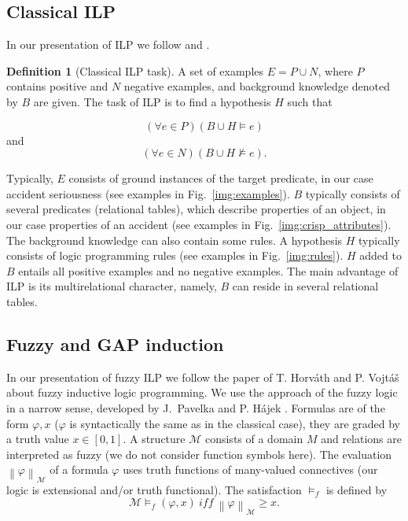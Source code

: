 \subsection{Classical ILP} \label{sec:ch80_ILP_classic}

In our presentation of ILP we follow \cite{dzeroski2001:relat_dm} and  \cite{biblio:Muggleton94inductivelogic}.


\theoremstyle{definition}
\newtheorem{definition}{Definition}
\newtheorem{theorem}{Theorem}

\begin{definition}[Classical ILP task]
A set of examples $E=P\cup N$, where $P$ contains positive and $N$ negative examples, and background knowledge denoted by $B$ are given. The task of ILP is to find a hypothesis $H$ such that 

$$
(\forall e\in P)(B\cup H\models e)
$$
and
$$
(\forall e\in N)(B\cup H\not\models e).
$$
\end{definition}
Typically, $E$ consists of ground instances of the target predicate, in our case accident seriousness (see examples in Fig.~\ref{img:examples}). $B$ typically consists of several predicates (relational tables), which describe properties of an object, in our case properties of an accident (see examples in Fig.~\ref{img:crisp_attributes}). The background knowledge can also contain some rules. A hypothesis $H$ typically consists of logic programming rules (see examples in Fig.~\ref{img:rules}). $H$ added to $B$ entails all positive examples and no negative examples.
%
The main advantage of ILP is its multirelational character, namely, $B$ can reside in several relational tables.





\subsection{Fuzzy and GAP induction}

In our presentation of fuzzy ILP we follow the paper of T. Horv\'ath and P. Vojt\'a\v s \citep{biblio:FILP} about fuzzy inductive logic programming.
We use the approach of the fuzzy logic in a narrow sense, developed by J.~Pavelka \citep{biblio:Pavelka} and P. H\'ajek \citep{biblio:Hajek}. Formulas are of the form $\varphi, x$ ($\varphi$ is syntactically the same as in the classical case), they are graded by a truth value $x\in [0,1]$.
A structure ${\mathcal M}$ consists of a domain $M$ and relations are interpreted as fuzzy (we do not consider function symbols here). The evaluation $\left\|\varphi\right\|_{{\mathcal M}}$ of a formula $\varphi$ uses truth functions of many-valued connectives (our logic is extensional and/or truth functional). The satisfaction $\models_f$ is defined by
$$
{\mathcal M}\models_f (\varphi, x)\ iff\ \left\|\varphi\right\|_{{\mathcal M}}\ge x.
$$

